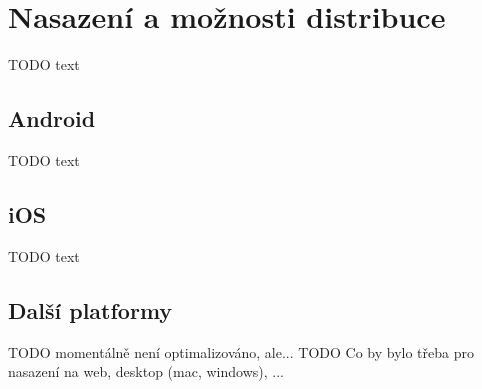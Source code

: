 \chapter{Nasazení a možnosti distribuce}

TODO text




\section{Android}

TODO text

\section{iOS}

TODO text

\section{Další platformy}

TODO momentálně není optimalizováno, ale...
TODO Co by bylo třeba pro nasazení na web, desktop (mac, windows), ...
